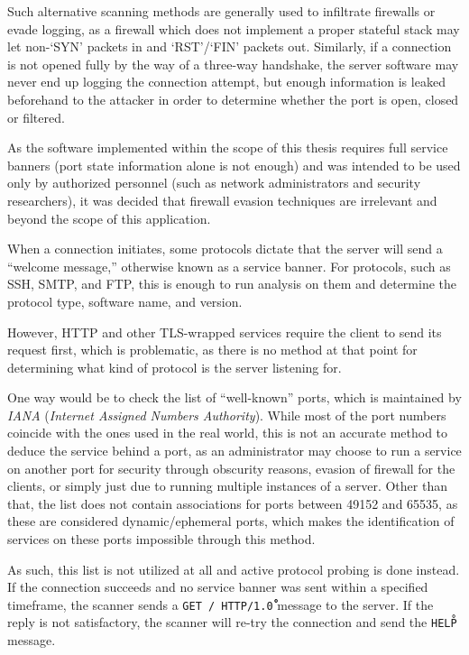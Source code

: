\documentclass[a4paper,12pt]{article}
\begin{document}
	Such alternative scanning methods are generally used to infiltrate firewalls or evade logging, as a firewall which does not implement a proper stateful stack may let non-`SYN' packets in and `RST'/`FIN' packets out. Similarly, if a connection is not opened fully by the way of a three-way handshake, the server software may never end up logging the connection attempt, but enough information is leaked beforehand to the attacker in order to determine whether the port is open, closed or filtered.
	
	As the software implemented within the scope of this thesis requires full service banners (port state information alone is not enough) and was intended to be used only by authorized personnel (such as network administrators and security researchers), it was decided that firewall evasion techniques are irrelevant and beyond the scope of this application.

 

	When a connection initiates, some protocols dictate that the server will send a ``welcome message,'' otherwise known as a service banner. For protocols, such as SSH, SMTP, and FTP, this is enough to run analysis on them and determine the protocol type, software name, and version.
	
	However, HTTP and other TLS-wrapped services require the client to send its request first, which is problematic, as there is no method at that point for determining what kind of protocol is the server listening for.
	
	One way would be to check the list of ``well-known'' ports\cite{iana16}, which is maintained by \textit{IANA} (\textit{Internet Assigned Numbers Authority}). While most of the port numbers coincide with the ones used in the real world, this is not an accurate method to deduce the service behind a port, as an administrator may choose to run a service on another port for security through obscurity reasons, evasion of firewall for the clients, or simply just due to running multiple instances of a server. Other than that, the list does not contain associations for ports between 49152 and 65535, as these are considered dynamic/ephemeral ports, which makes the identification of services on these ports impossible through this method.
	
	As such, this list is not utilized at all and active protocol probing is done instead. If the connection succeeds and no service banner was sent within a specified timeframe, the scanner sends a \texttt{GET / HTTP/1.0}\texttt{\r\n\r\n} message to the server. If the reply is not satisfactory, the scanner will re-try the connection and send the \texttt{HELP\r\n} message.
	
\end{document}

